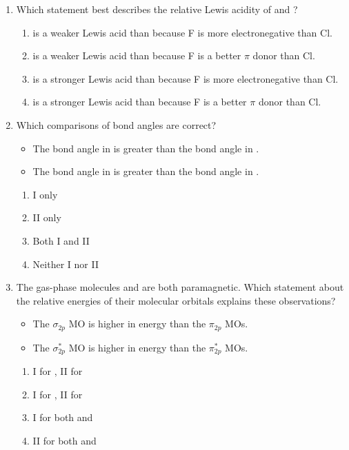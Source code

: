\documentclass[twocolumn, 10pt]{article}
\begin{document}
\begin{enumerate}
    \item Which statement best describes the relative Lewis acidity of  and ?
    \begin{enumerate}
        \item {} is a weaker Lewis acid than  because F is more electronegative than Cl.
        \item {} is a weaker Lewis acid than  because F is a better $\pi$ donor than Cl.
        \item {} is a stronger Lewis acid than  because F is more electronegative than Cl.
        \item {} is a stronger Lewis acid than  because F is a better $\pi$ donor than Cl.
    \end{enumerate}

    \item Which comparisons of bond angles are correct?
    \begin{itemize}
        \item[I.] The bond angle in  is greater than the bond angle in .
        \item[II.] The bond angle in  is greater than the bond angle in .
    \end{itemize}
    \begin{enumerate}
        \item I only
        \item II only
        \item Both I and II
        \item Neither I nor II
    \end{enumerate}

    \item The gas-phase molecules  and  are both paramagnetic. Which statement about the relative energies of their molecular orbitals explains these observations?
    \begin{itemize}
        \item[I.] The $\sigma_{2p}$ MO is higher in energy than the $\pi_{2p}$ MOs.
        \item[II.] The $\sigma^*_{2p}$ MO is higher in energy than the $\pi^*_{2p}$ MOs.
    \end{itemize}
    \begin{enumerate}
        \item I for , II for 
        \item I for , II for 
        \item I for both  and 
        \item II for both  and 
    \end{enumerate}


\end{enumerate}
\end{document}
